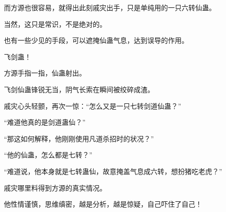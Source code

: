 \begin{this_body}
而方源也很容易，就得出此刻戚灾出手，只是单纯用的一只六转仙蛊。

当然，这只是常识，不是绝对的。

也有一些少见的手段，可以遮掩仙蛊气息，达到误导的作用。

飞剑蛊！

方源手指一指，仙蛊射出。

飞剑仙蛊锋锐无当，阴气长索在瞬间被绞碎成渣。

戚灾心头轻颤，再次一惊：“怎么又是一只七转剑道仙蛊？”

“难道他真的是剑道蛊仙？”

“那这如何解释，他刚刚使用凡道杀招时的状况？”

“他的仙蛊，怎么都是七转？”

“难道说，他本身就是七转蛊仙，故意掩盖气息成六转，想扮猪吃老虎？”

戚灾哪里料得到方源的真实情况。

他性情谨慎，思维缜密，越是分析，越是惊疑，自己吓住了自己！

\end{this_body}

